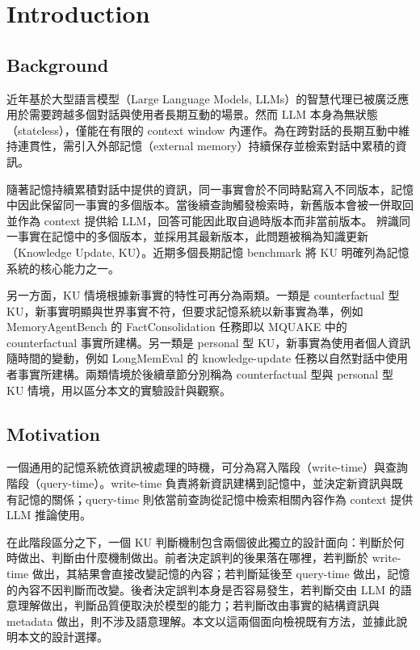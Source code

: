 \chapter{Introduction}
\label{ch:introduction}
\section{Background}

近年基於大型語言模型（Large Language Models, LLMs）的智慧代理已被廣泛應用於需要跨越多個對話與使用者長期互動的場景。然而 LLM 本身為無狀態（stateless），僅能在有限的 context window 內運作。為在跨對話的長期互動中維持連貫性，需引入外部記憶（external memory）持續保存並檢索對話中累積的資訊。

隨著記憶持續累積對話中提供的資訊，同一事實會於不同時點寫入不同版本，記憶中因此保留同一事實的多個版本。當後續查詢觸發檢索時，新舊版本會被一併取回並作為 context 提供給 LLM，回答可能因此取自過時版本而非當前版本。
辨識同一事實在記憶中的多個版本，並採用其最新版本，此問題被稱為知識更新（Knowledge Update, KU）。近期多個長期記憶 benchmark 將 KU 明確列為記憶系統的核心能力之一\cite{wulongmemeval}\hspace{-0.05em}\cite{hu2026evaluating}\hspace{-0.05em}\cite{tavakoli2026beyond}。

另一方面，KU 情境根據新事實的特性可再分為兩類。一類是 counterfactual 型 KU，新事實明顯與世界事實不符，但要求記憶系統以新事實為準，例如 MemoryAgentBench 的 FactConsolidation 任務即以 MQUAKE 中的 counterfactual 事實所建構\cite{hu2026evaluating}\hspace{-0.05em}\cite{zhong2023mquake}。另一類是 personal 型 KU，新事實為使用者個人資訊隨時間的變動，例如 LongMemEval 的 knowledge-update 任務以自然對話中使用者事實所建構\cite{wulongmemeval}。兩類情境於後續章節分別稱為 counterfactual 型與 personal 型 KU 情境，用以區分本文的實驗設計與觀察。

\section{Motivation}

一個通用的記憶系統依資訊被處理的時機，可分為寫入階段（write-time）與查詢階段（query-time）。write-time 負責將新資訊建構到記憶中，並決定新資訊與既有記憶的關係；query-time 則依當前查詢從記憶中檢索相關內容作為 context 提供 LLM 推論使用。

在此階段區分之下，一個 KU 判斷機制包含兩個彼此獨立的設計面向：判斷於何時做出、判斷由什麼機制做出。前者決定誤判的後果落在哪裡，若判斷於 write-time 做出，其結果會直接改變記憶的內容；若判斷延後至 query-time 做出，記憶的內容不因判斷而改變。後者決定誤判本身是否容易發生，若判斷交由 LLM 的語意理解做出，判斷品質便取決於模型的能力；若判斷改由事實的結構資訊與 metadata 做出，則不涉及語意理解。本文以這兩個面向檢視既有方法，並據此說明本文的設計選擇。

